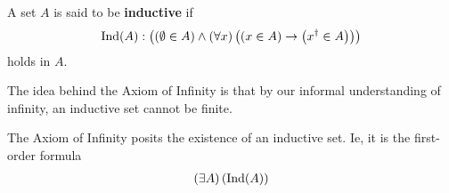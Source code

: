 \begin{boxdefinition}[Inductivity]
    A set $A$ is said to be \textbf{inductive} if
    \begin{align*}
        \operatorname{Ind}(A) : \left( \left( \emptyset \in A \right) \land \left( \forall x \right)\left( \left( x \in A \right) \to \left( x^{\dagger} \in A \right) \right) \right)
    \end{align*}
    holds in $A$.
\end{boxdefinition}

The idea behind the Axiom of Infinity is that by our informal understanding of infinity, an inductive set cannot be finite.

\begin{baxiom}\label{ZF:Infinity}
    The Axiom of Infinity posits the existence of an inductive set. Ie, it is the first-order formula
    \begin{align*}
        \left( \exists A \right)\left( \operatorname{Ind}(A) \right)
    \end{align*}
\end{baxiom}


